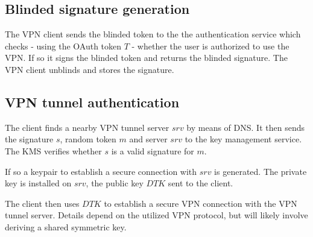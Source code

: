 \documentclass[a4paper]{scrreprt}
\newcommand{\var}[1]{\textit{#1}}
\begin{document}
\subsection{Blinded signature generation}

The VPN client sends the blinded token to the the authentication service which
checks - using the OAuth token $T$ - whether the user is authorized to use the
VPN.  If so it signs the blinded token and returns the blinded signature. The
VPN client unblinds and stores the signature.


\FloatBarrier

\subsection{VPN tunnel authentication}

The client finds a nearby VPN tunnel server $srv$ by means of DNS. It then
sends the signature $s$, random token $m$ and server $srv$ to the key
management service. The KMS verifies whether $s$ is a valid signature for $m$.

If so a keypair to establish a secure connection with $srv$ is generated. The
private key is installed on $srv$, the public key $DTK$ sent to the client.

The client then uses $DTK$ to establish a secure VPN connection with the VPN
tunnel server. Details depend on the utilized VPN protocol, but will likely
involve deriving a shared symmetric key.
\end{document}
